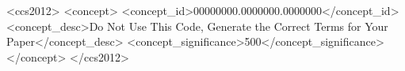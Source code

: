 \documentclass[sigconf]{acmart} %
\begin{document}
\begin{abstract} %
  This document exemplifies the minimal information that must be kept
  for CCS 2026 submissions. The comments in the .tex file clarify
  which parts must be kept as such and which parts may/should be updated.
\end{abstract}

\begin{CCSXML} %
<ccs2012>
 <concept>
  <concept_id>00000000.0000000.0000000</concept_id>
  <concept_desc>Do Not Use This Code, Generate the Correct Terms for Your Paper</concept_desc>
  <concept_significance>500</concept_significance>
 </concept>
</ccs2012>
\end{CCSXML}



\end{document}
